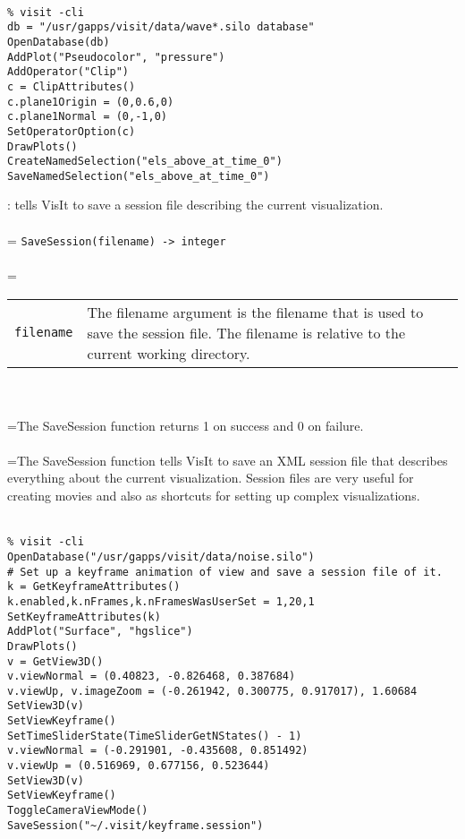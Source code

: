 \documentclass[10pt,a4paper]{report}
\begin{document}
\\[-6mm]
\begin{verbatim}% visit -cli
db = "/usr/gapps/visit/data/wave*.silo database"
OpenDatabase(db)
AddPlot("Pseudocolor", "pressure")
AddOperator("Clip")
c = ClipAttributes()
c.plane1Origin = (0,0.6,0)
c.plane1Normal = (0,-1,0)
SetOperatorOption(c)
DrawPlots()
CreateNamedSelection("els_above_at_time_0")
SaveNamedSelection("els_above_at_time_0")
\end{verbatim}
\newpage


{}
: tells VisIt to save a session file describing the current visualization.\\[-3mm]

 \\ 
\hangindent=\parindent 
\verb!SaveSession(filename) -> integer!\\ [-3mm]

 \\ 
\hangindent=\parindent 
\begin{tabular}{lp{9cm}}
\verb!filename! & The filename argument is the filename that is used to save the session file. The filename is relative to the current working directory. \\
\end{tabular} \\[-2mm]


 \\ 
\hangindent=\parindent The SaveSession function returns 1 on success and 0 on failure. \\[-3mm] 

 \\ 
\hangindent=\parindent The SaveSession function tells VisIt to save an XML session file that describes everything about the current visualization. Session files are very useful for creating movies and also as shortcuts for setting up complex visualizations. \\[-3mm] 

\\[-6mm]
\begin{verbatim}% visit -cli
OpenDatabase("/usr/gapps/visit/data/noise.silo")
# Set up a keyframe animation of view and save a session file of it.
k = GetKeyframeAttributes()
k.enabled,k.nFrames,k.nFramesWasUserSet = 1,20,1
SetKeyframeAttributes(k)
AddPlot("Surface", "hgslice")
DrawPlots()
v = GetView3D()
v.viewNormal = (0.40823, -0.826468, 0.387684)
v.viewUp, v.imageZoom = (-0.261942, 0.300775, 0.917017), 1.60684
SetView3D(v)
SetViewKeyframe()
SetTimeSliderState(TimeSliderGetNStates() - 1)
v.viewNormal = (-0.291901, -0.435608, 0.851492)
v.viewUp = (0.516969, 0.677156, 0.523644)
SetView3D(v)
SetViewKeyframe()
ToggleCameraViewMode()
SaveSession("~/.visit/keyframe.session")
\end{verbatim}
\newpage
\end{document}
